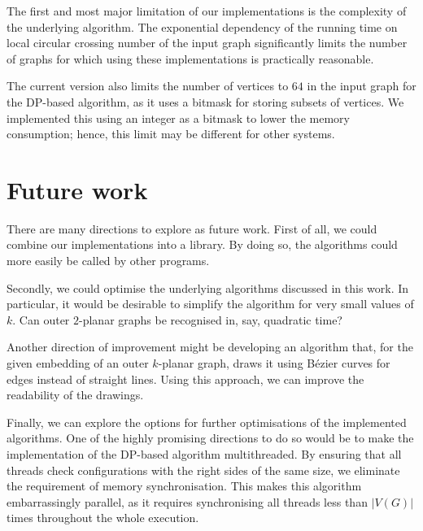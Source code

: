 The first and most major limitation of our implementations is the complexity of the underlying algorithm. The exponential dependency of the running time on local circular crossing number of the input graph significantly limits the number of graphs for which using these implementations is practically reasonable.

The current version also limits the number of vertices to \(64\) in the input graph for the DP-based algorithm, as it uses a bitmask for storing subsets of vertices. We implemented this using an integer as a bitmask to lower the memory consumption; hence, this limit may be different for other systems.

\section{Future work}

There are many directions to explore as future work. First of all, we could combine our implementations into a library. By doing so, the algorithms could more easily be called by other programs.

Secondly, we could optimise the underlying algorithms discussed in this work. In particular, it would be desirable to simplify the algorithm for very small values of \(k\). Can outer \(2\)-planar graphs be recognised in, say, quadratic time?

Another direction of improvement might be developing an algorithm that, for the given embedding of an outer \(k\)-planar graph, draws it using Bézier curves for edges instead of straight lines. Using this approach, we can improve the readability of the drawings.

Finally, we can explore the options for further optimisations of the implemented algorithms. One of the highly promising directions to do so would be to make the implementation of the DP-based algorithm multithreaded. By ensuring that all threads check configurations with the right sides of the same size, we eliminate the requirement of memory synchronisation. This makes this algorithm embarrassingly parallel, as it requires synchronising all threads less than \(|V(G)|\) times throughout the whole execution.
